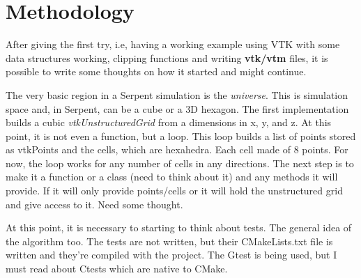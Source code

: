 \documentclass{elsarticle}
\begin{document}

\section{Methodology}

After giving the first try, i.e, having a working example using VTK with some data structures working, clipping functions and writing
\textbf{vtk/vtm} files, it is possible to write some thoughts on how it started and might continue.

The very basic region in a Serpent simulation is the \textit{universe}. This is simulation space and, in Serpent, can be a cube or a 3D hexagon.
The first implementation builds a cubic \textit{vtkUnstructuredGrid} from a dimensions in x, y, and z. At this point, it is not even a function,
but a loop. This loop builds a list of points stored as vtkPoints and the cells, which are hexahedra. Each cell made of 8 points. For now, the
loop works for any number of cells in any directions. The next step is to make it a function or a class (need to think about it) and any methods
it will provide. If it will only provide points/cells or it will hold the unstructured grid and give access to it. Need some thought.

At this point, it is necessary to starting to think about tests. The general idea of the algorithm too. The tests are not written, but their
CMakeLists.txt file is written and they're compiled with the project. The Gtest is being used, but I must read about Ctests which are native
to CMake.
\end{document}
